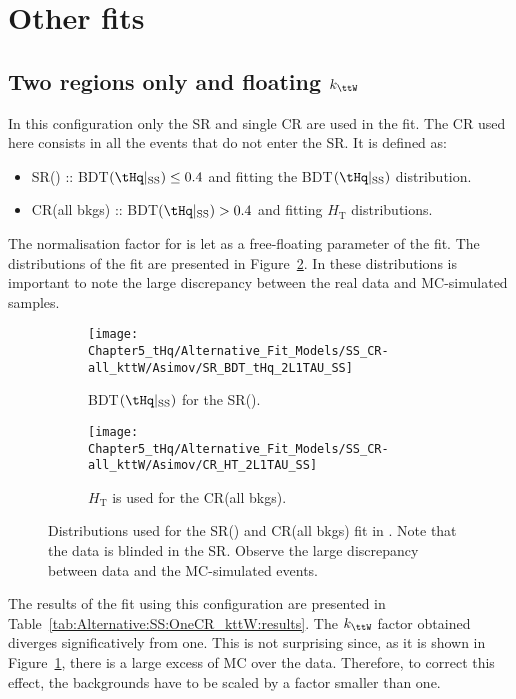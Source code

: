 \section{Other \dilepSStau fits}

\subsection{Two regions only and floating $k_{\ttW}$}
\label{sec:Alternative:SS:OneCR_kttW}
In this configuration only the SR and single CR are used in the fit. 
The CR used here consists in all the events that do not enter the SR.
It is defined as:
\begin{itemize}
	\item SR(\tHq) :: BDT$(\tHq|_{\text{SS}}) \leq 0.4$ and fitting the BDT$(\tHq|_{\text{SS}})$ distribution.
	\item CR(all bkgs) :: BDT$(\tHq|_{\text{SS}}) > 0.4$ and fitting $H_{\text{T}}$ distributions. 
\end{itemize}
The normalisation factor for \ttW is let as a free-floating parameter of the fit. The distributions of the fit
are presented in Figure~\ref{fig:Alternative:SS:OneCR_kttW:distributions}. In these distributions is 
important to note the large discrepancy between the real data and MC-simulated samples.

\begin{figure}[h]
\centering
\begin{subfigure}{.5\textwidth}
  \centering
  \texttt{[image: Chapter5\_tHq/Alternative\_Fit\_Models/SS\_CR-all\_kttW/Asimov/SR\_BDT\_tHq\_2L1TAU\_SS]}
  \caption{BDT$(\tHq|_{\text{SS}})$ for the SR(\tHq).}
\end{subfigure}%
\begin{subfigure}{.5\textwidth}
  \centering
  \texttt{[image: Chapter5\_tHq/Alternative\_Fit\_Models/SS\_CR-all\_kttW/Asimov/CR\_HT\_2L1TAU\_SS]}
  \caption{$H_{\text{T}}$ is used for the CR(all bkgs).}
  \label{fig:Alternative:SS:OneCR_kttW:distributions:HT}
\end{subfigure}
\caption{Distributions used for the SR(\tHq) and CR(all bkgs) fit in \dilepSStau. 
	Note that the data is blinded in the SR.
	Observe the large discrepancy between data and the MC-simulated events.} %
\label{fig:Alternative:SS:OneCR_kttW:distributions}
\end{figure}

The results of the fit using this configuration are presented in Table~\ref{tab:Alternative:SS:OneCR_kttW:results}.
The $k_{\ttW}$ factor obtained diverges significatively from one. This is not surprising since, as it is shown
in Figure~\ref{fig:Alternative:SS:OneCR_kttW:distributions:HT}, there is a large excess of MC over the data. 
Therefore, to correct this effect, the backgrounds have to be scaled by a factor smaller than one. 


